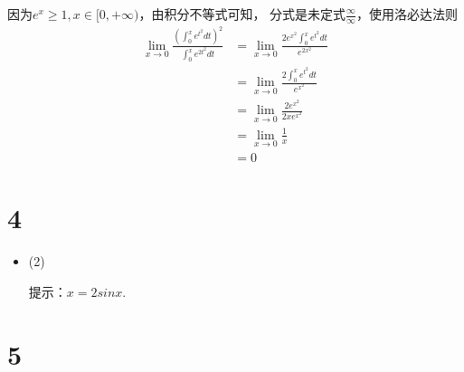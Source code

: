 \documentclass{article}
\begin{document}
\begin{itemize}
        因为$e^x \geq 1, x \in [0, + \infty)$，由积分不等式可知，
        分式是未定式$\frac{\infty}{\infty}$，使用洛必达法则
        \begin{align*}
          \lim \limits_{x \to 0} \frac{\left(\int_0^x e^{t^2} dt\right)^2}{\int_0^x e^{2t^2} dt}
           & = \lim \limits_{x \to 0} \frac{2 e^{x^2}\int_0^x e^{t^2} dt}{e^{2x^2}} \\
           & = \lim \limits_{x \to 0} \frac{2 \int_0^x e^{t^2} dt}{e^{x^2}}         \\
           & = \lim \limits_{x \to 0} \frac{2 e^{x^2}}{2x e^{x^2}}                  \\
           & = \lim \limits_{x \to 0} \frac{1}{x}                                   \\
           & = 0
        \end{align*}

\end{itemize}

\section*{4}

\begin{itemize}
  \item (2)

        提示：$x = 2sinx$.
\end{itemize}

\section*{5}
\end{document}
